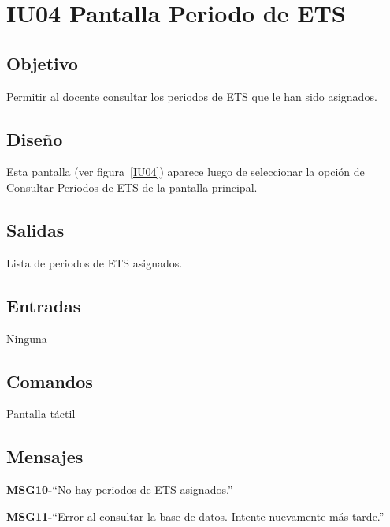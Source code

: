 \section{IU04 Pantalla Periodo de ETS}

\subsection{Objetivo}
	Permitir al docente consultar los periodos de ETS que le han sido asignados. 

\subsection{Diseño}
	Esta pantalla  (ver figura~\ref{IU04}) aparece luego de seleccionar la opción de Consultar Periodos de ETS de la pantalla principal. 


\subsection{Salidas}

	Lista de periodos de ETS asignados. 

\subsection{Entradas}
Ninguna

\subsection{Comandos}

	Pantalla táctil


\subsection{Mensajes}

\begin{Citemize}
	\item {\bf MSG10-}{``No hay periodos de ETS asignados.''}
	\item {\bf MSG11-}{``Error al consultar la base de datos. Intente nuevamente más tarde.''}
\end{Citemize}

